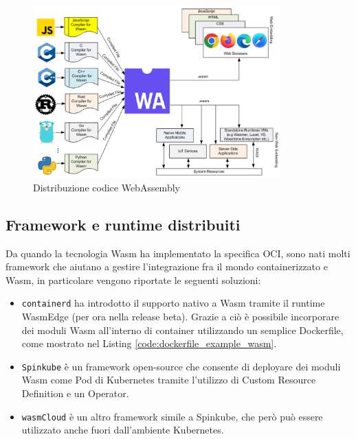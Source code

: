 \FloatBarrier
\begin{figure}[h]
    \centering
    \includegraphics[width=0.85\textwidth]{img/wasm-distribution.png}
    \caption{Distribuzione codice WebAssembly\protect\footnotemark}
    \label{fig:wasm_devices}
\end{figure}
\FloatBarrier
{}

\subsection{Framework e runtime distribuiti}

Da quando la tecnologia Wasm ha implementato la specifica OCI, sono nati molti framework che aiutano a gestire l'integrazione fra il mondo containerizzato e Wasm, in particolare vengono riportate le seguenti soluzioni:
\begin{itemize}
    \item \texttt{containerd} ha introdotto il supporto nativo a Wasm tramite il runtime WasmEdge\cite{containerd_runwasi} (per ora nella release beta). Grazie a ciò è possibile incorporare dei moduli Wasm all'interno di container utilizzando un semplice Dockerfile, come mostrato nel Listing \ref{code:dockerfile_example_wasm}.

    \item \texttt{Spinkube}\cite{spinkube_overview} è un framework open-source che consente di deployare dei moduli Wasm come Pod di Kubernetes tramite l'utilizzo di Custom Resource Definition e un Operator.
    
    \item \texttt{wasmCloud} è un altro framework simile a Spinkube, che però può essere utilizzato anche fuori dall'ambiente Kubernetes. 
\end{itemize}


